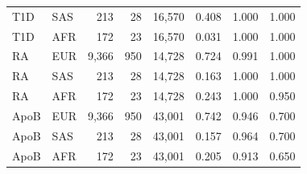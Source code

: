 \documentclass{article}
\begin{document}
\begin{table}[t]
\begin{tabular}{llrrrccc}
T1D & SAS & 213 & 28 & 16{,}570 & 0.408 & 1.000 & 1.000 \\
T1D & AFR & 172 & 23 & 16{,}570 & 0.031 & 1.000 & 1.000 \\
\midrule
RA & EUR & 9{,}366 & 950 & 14{,}728 & 0.724 & 0.991 & 1.000 \\
RA & SAS & 213 & 28 & 14{,}728 & 0.163 & 1.000 & 1.000 \\
RA & AFR & 172 & 23 & 14{,}728 & 0.243 & 1.000 & 0.950 \\
\midrule
ApoB & EUR & 9{,}366 & 950 & 43{,}001 & 0.742 & 0.946 & 0.700 \\
ApoB & SAS & 213 & 28 & 43{,}001 & 0.157 & 0.964 & 0.700 \\
ApoB & AFR & 172 & 23 & 43{,}001 & 0.205 & 0.913 & 0.650 \\
\bottomrule
\end{tabular}
\end{table}




\clearpage



\end{document}
